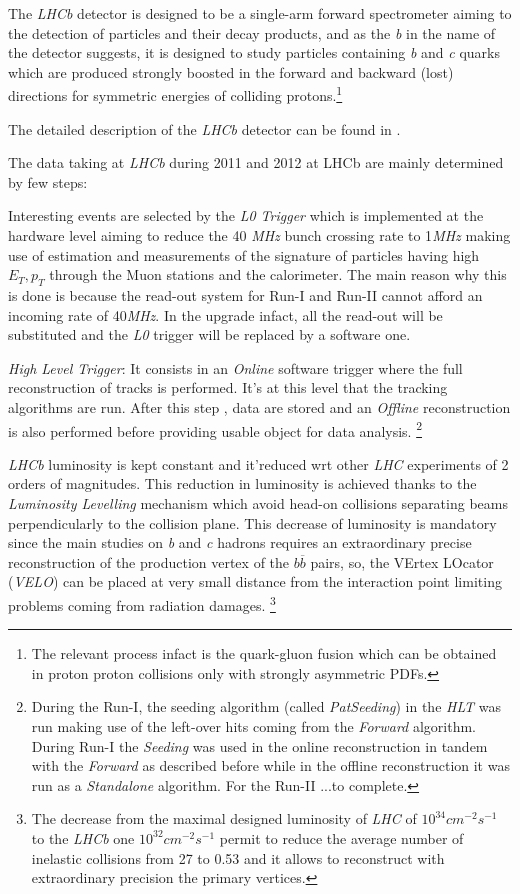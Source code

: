 \documentclass[paper=a4, fontsize=10pt]{scrartcl}
\numberwithin{equation}{section}		%
\numberwithin{figure}{section}			%
\numberwithin{table}{section}				%
\begin{document}
The \textit{LHCb} detector is designed to be a single-arm forward spectrometer aiming to the detection of particles and their decay products, and as the \textit{b} in the name of the detector suggests, it is designed to study particles containing \textit{b} and \textit{c} quarks which are produced strongly boosted in the forward and backward (lost)  directions for symmetric energies of colliding protons.\footnote{The relevant process infact is the quark-gluon fusion which can be obtained in proton proton collisions only with strongly asymmetric PDFs.}

The detailed description of the \textit{LHCb} detector can be found in \cite{Blake1}.

The data taking at \textit{LHCb} during 2011 and 2012 at LHCb are mainly determined by few steps:
\begin{itemize}
\item{Interesting events are selected by the \textit{L0 Trigger} which is implemented at the hardware level aiming to reduce the 40 \textit{MHz} bunch crossing rate to 1\textit{MHz} making use of estimation and measurements of the signature of particles having high $E_{T},p_{T}$ through the Muon stations and the calorimeter. The main reason why this is done is because the read-out system for Run-I and Run-II cannot afford an incoming rate of 40\textit{MHz}. In the upgrade infact, all the read-out will be substituted and the \textit{L0} trigger will be replaced by a software one.}
\item{\textit{High Level Trigger}: It consists in an \textit{Online} software trigger where the full reconstruction of tracks is performed. It's at this level that the tracking algorithms are run. After this step , data are stored and an \textit{Offline} reconstruction is also performed before providing usable object for data analysis. \footnote{During the Run-I, the seeding algorithm (called \textit{PatSeeding}) in the \textit{HLT} was run making use of the left-over hits coming from the \textit{Forward} algorithm. During Run-I the \textit{Seeding} was used in the online reconstruction in tandem with the \textit{Forward} as described before while in the offline reconstruction it was run as a \textit{Standalone} algorithm. For the Run-II ...to complete.}
\item{\textit{LHCb} luminosity is kept constant and it'reduced wrt other \textit{LHC} experiments of 2 orders of magnitudes. This reduction in luminosity is achieved thanks to the \textit{Luminosity Levelling} mechanism which avoid head-on collisions separating beams perpendicularly to the collision plane. This decrease of luminosity is mandatory since the main studies on \textit{b} and \textit{c} hadrons requires an extraordinary precise reconstruction of the production vertex of the $b\overline{b}$ pairs, so, the VErtex LOcator (\textit{VELO}) can be placed at very small distance from the interaction point limiting problems coming from radiation damages. \footnote{The decrease from the maximal designed luminosity of \textit{LHC} of $10^{34}cm^{-2}s^{-1}$ to the \textit{LHCb} one  $10^{32}cm^{-2}s^{-1}$ permit to reduce the average number of inelastic collisions from 27 to 0.53 and it allows to reconstruct with extraordinary precision the primary vertices.}
}}
\end{itemize}
\end{document}
